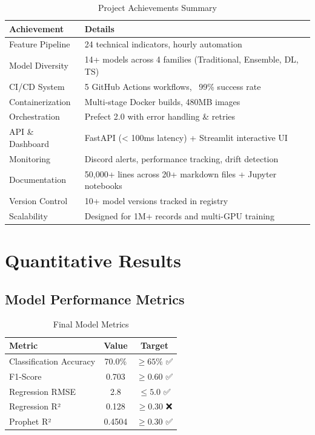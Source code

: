 \begin{table}[H]
\centering
\caption{Project Achievements Summary}
\begin{tabularx}{\textwidth}{lX}
\toprule
\textbf{Achievement} & \textbf{Details} \\
\midrule
Feature Pipeline & 24 technical indicators, hourly automation \\
Model Diversity & 14+ models across 4 families (Traditional, Ensemble, DL, TS) \\
CI/CD System & 5 GitHub Actions workflows, ~99\% success rate \\
Containerization & Multi-stage Docker builds, 480MB images \\
Orchestration & Prefect 2.0 with error handling \& retries \\
API \& Dashboard & FastAPI (< 100ms latency) + Streamlit interactive UI \\
Monitoring & Discord alerts, performance tracking, drift detection \\
Documentation & 50,000+ lines across 20+ markdown files + Jupyter notebooks \\
Version Control & 10+ model versions tracked in registry \\
Scalability & Designed for 1M+ records and multi-GPU training \\
\bottomrule
\end{tabularx}
\end{table}

\section{Quantitative Results}

\subsection{Model Performance Metrics}

\begin{table}[H]
\centering
\caption{Final Model Metrics}
\begin{tabularx}{\textwidth}{lcc}
\toprule
\textbf{Metric} & \textbf{Value} & \textbf{Target} \\
\midrule
Classification Accuracy & 70.0\% & $\geq 65\%$ ✅ \\
F1-Score & 0.703 & $\geq 0.60$ ✅ \\
Regression RMSE & 2.8 & $\leq 5.0$ ✅ \\
Regression R² & 0.128 & $\geq 0.30$ ❌ \\
Prophet R² & 0.4504 & $\geq 0.30$ ✅ \\
\bottomrule
\end{tabularx}
\end{table}

